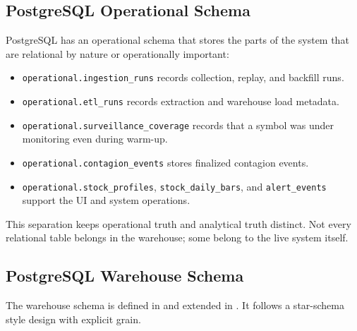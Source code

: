 \documentclass[11pt,a4paper]{article}
\begin{document}
\subsection{PostgreSQL Operational Schema}
PostgreSQL has an operational schema that stores the parts of the system that are relational by nature or operationally important:
\begin{itemize}
    \item \texttt{operational.ingestion\_runs} records collection, replay, and backfill runs.
    \item \texttt{operational.etl\_runs} records extraction and warehouse load metadata.
    \item \texttt{operational.surveillance\_coverage} records that a symbol was under monitoring even during warm-up.
    \item \texttt{operational.contagion\_events} stores finalized contagion events.
    \item \texttt{operational.stock\_profiles}, \texttt{stock\_daily\_bars}, and \texttt{alert\_events} support the UI and system operations.
\end{itemize}

This separation keeps operational truth and analytical truth distinct. Not every relational table belongs in the warehouse; some belong to the live system itself.

\subsection{PostgreSQL Warehouse Schema}
The warehouse schema is defined in  and extended in . It follows a star-schema style design with explicit grain.
\end{document}
